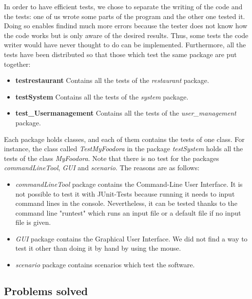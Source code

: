 In order to have efficient tests, we chose to separate the writing of the code and the tests: one of us wrote some parts of the program and the other one tested it. Doing so enables findind much more errors because the tester does not know how the code works but is only aware of the desired results. Thus, some tests the code writer would have never thought to do can be implemented.
Furthermore, all the tests have been distributed so that those which test the same package are put together:
\begin{itemize}
	\item{\textbf{testrestaurant}} Contains all the tests of the \textit{restaurant} package.
	\item{\textbf{testSystem}} Contains all the tests of the  \textit{system} package.
	\item{\textbf{test\_Usermanagement}} Contains all the tests of the \textit{user\_management} package.
\end{itemize}
Each package holds classes, and each of them contains the tests of one class. For instance, the class called \textit{TestMyFoodora} in the package \textit{testSystem} holds all the tests of the class \textit{MyFoodora}.  
Note that there is no test for the packages \textit{commandLineTool}, \textit{GUI} and \textit{scenario}. The reasons are as follows:
\begin{itemize}
	\item{\textit{commandLineTool}} package contains the Command-Line User Interface. It is not possible to test it with JUnit-Tests because running it needs to input command lines in the console. Nevertheless, it can be tested thanks to the command line "runtest" which runs an input file or a default file if no input file is given.
	\item{\textit{GUI}} package contains the Graphical User Interface. We did not find a way to test it other than doing it by hand by using the mouse.
	\item{\textit{scenario}} package contains scenarios which test the software.
\end{itemize}

\subsection{Problems solved}
\label{sub:problems_solved}